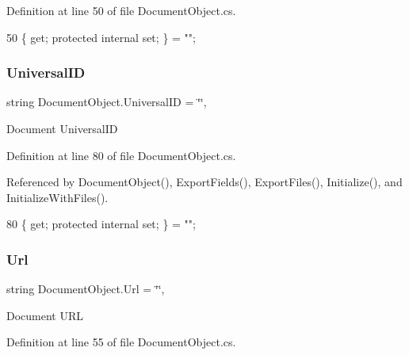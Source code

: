 Definition at line 50 of file Document\+Object.\+cs.


\begin{DoxyCode}
50 \{ \textcolor{keyword}{get}; \textcolor{keyword}{protected} \textcolor{keyword}{internal} \textcolor{keyword}{set}; \} = \textcolor{stringliteral}{""};
\end{DoxyCode}
\mbox{\label{class_document_object_a8b96d04632a2802e7cc5466ca5cee8cf}} 
\subsubsection{\texorpdfstring{Universal\+ID}{UniversalID}}
{\footnotesize\ttfamily string Document\+Object.\+Universal\+ID = \char`\"{}\char`\"{}\hspace{0.3cm}{\ttfamily [get]}, {\ttfamily [set]}}



Document Universal\+ID 



Definition at line 80 of file Document\+Object.\+cs.



Referenced by Document\+Object(), Export\+Fields(), Export\+Files(), Initialize(), and Initialize\+With\+Files().


\begin{DoxyCode}
80 \{ \textcolor{keyword}{get}; \textcolor{keyword}{protected} \textcolor{keyword}{internal} \textcolor{keyword}{set}; \} = \textcolor{stringliteral}{""};
\end{DoxyCode}
\mbox{\label{class_document_object_ac86b730cf8931b2221af577d32ca2f31}} 
\subsubsection{\texorpdfstring{Url}{Url}}
{\footnotesize\ttfamily string Document\+Object.\+Url = \char`\"{}\char`\"{}\hspace{0.3cm}{\ttfamily [get]}, {\ttfamily [set]}}



Document U\+RL 



Definition at line 55 of file Document\+Object.\+cs.


